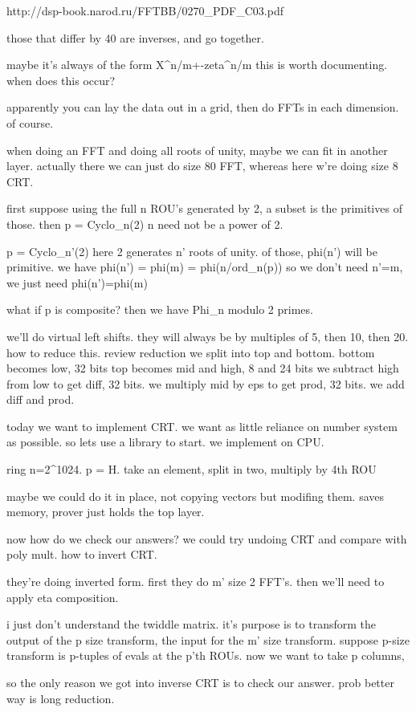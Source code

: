 http://dsp-book.narod.ru/FFTBB/0270_PDF_C03.pdf

those that differ by 40 are inverses, and go together.

maybe it's always of the form X^{n/m}+-zeta^{n/m}
this is worth documenting. when does this occur?


apparently you can lay the data out in a grid, then do FFTs in each dimension. of course.

when doing an FFT and doing all roots of unity, maybe we can fit in another layer.
actually there we can just do size 80 FFT, whereas here w're doing size 8 CRT.

first suppose using the full n ROU's generated by 2, a subset is the primitives of those.
then p = Cyclo_n(2)
n need not be a power of 2.

p = Cyclo_n'(2)
here 2 generates n' roots of unity. of those, phi(n') will be primitive. we have
phi(n') = phi(m) = phi(n/ord_n(p))
so we don't need n'=m, we just need phi(n')=phi(m)


what if p is composite?
then we have Phi_n modulo 2 primes. 

we'll do virtual left shifts. 
they will always be by multiples of 5, then 10, then 20.
how to reduce this. review reduction
we split into top and bottom.
bottom becomes low, 32 bits
top becomes mid and high, 8 and 24 bits
we subtract high from low to get diff, 32 bits.
we multiply mid by eps to get prod, 32 bits.
we add diff and prod.

today we want to implement CRT.
we want as little reliance on number system as possible.
so lets use a library to start. 
we implement on CPU.

ring n=2^1024.
p = H.
take an element, split in two, multiply by 4th ROU

maybe we could do it in place, not copying vectors but modifing them.
saves memory, prover just holds the top layer.

now how do we check our answers?
we could try undoing CRT and compare with poly mult.
how to invert CRT.

they're doing inverted form.
first they do m' size 2 FFT's. 
then we'll need to apply eta composition. 

i just don't understand the twiddle matrix.
it's purpose is to transform the output of the p size transform, the input for the m' size transform.
suppose p-size transform is p-tuples of evals at the p'th ROUs. now we want to take p columns, 

so the only reason we got into inverse CRT is to check our answer.
prob better way is long reduction.

